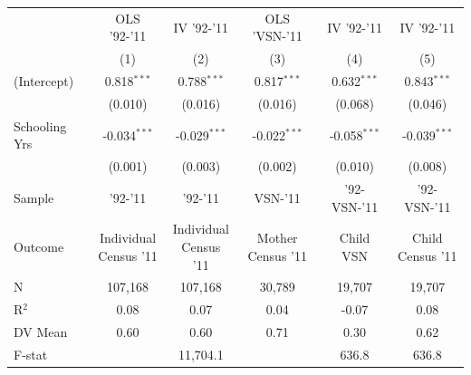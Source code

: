 
\begin{tabular}[t]{lccccc}
\toprule
  & OLS '92-'11 & IV '92-'11 & OLS 'VSN-'11 & IV '92-'11  & IV '92-'11  \\
  & (1) & (2) & (3) & (4) & (5)\\
\midrule
(Intercept) & 0.818$^{***}$ & 0.788$^{***}$ & 0.817$^{***}$ & 0.632$^{***}$ & 0.843$^{***}$\\
 & (0.010) & (0.016) & (0.016) & (0.068) & (0.046)\\
Schooling Yrs & -0.034$^{***}$ & -0.029$^{***}$ & -0.022$^{***}$ & -0.058$^{***}$ & -0.039$^{***}$\\
 & (0.001) & (0.003) & (0.002) & (0.010) & (0.008)\\
\midrule
Sample & '92-'11 & '92-'11 & VSN-'11 & '92-VSN-'11 & '92-VSN-'11 \\
Outcome & \makecell{Individual\\Census '11} & \makecell{Individual\\Census '11} & \makecell{Mother\\Census '11} & \makecell{Child\\VSN} & \makecell{Child\\Census '11} \\
\midrule
N & 107,168 & 107,168 & 30,789 & 19,707 & 19,707\\
R$^2$ & 0.08 & 0.07 & 0.04 & -0.07 & 0.08\\
DV Mean & 0.60 & 0.60 & 0.71 & 0.30 & 0.62\\
F-stat &  & 11,704.1 &  & 636.8 & 636.8\\
\bottomrule
\end{tabular}

